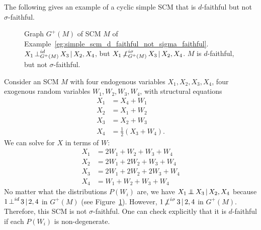 The following gives an example of a cyclic simple SCM that is $d$-faithful but not $\sigma$-faithful.
  \begin{Eg}\label{eg:simple_scm_d_faithful_not_sigma_faithful}
  \begin{figure}\centering
  \caption{Graph $G^+(M)$ of SCM $M$ of Example~\ref{eg:simple_scm_d_faithful_not_sigma_faithful}. 
  $X_1 \operatorname*{\perp}^{id}_{G^+(M)} X_3 \operatorname*{|} X_2, X_4$, but $X_1 \operatorname*{\not\perp}^{i\sigma}_{G^+(M)} X_3 \operatorname*{|} X_2, X_4$.
  $M$ is $d$-faithful, but not $\sigma$-faithful.\label{fig:simple_scm_d_faithful_not_sigma_faithful}}
  \end{figure}
Consider an SCM $M$ with four endogenous variables $X_1,X_2,X_3,X_4$, four exogenous random variables $W_1,W_2,W_3,W_4$, with structural equations
  \begin{align*}
    X_1&=X_4 + W_1 \\
    X_2&=X_1 + W_2 \\
    X_3&=X_2 + W_3 \\
    X_4&=\tfrac{1}{2} (X_3 + W_4).
  \end{align*}
We can solve for $X$ in terms of $W$:
  \begin{align*}
    X_1&=2 W_1 + W_2 + W_3 + W_4 \\
    X_2&=2 W_1 + 2 W_2 + W_3 + W_4 \\
    X_3&=2 W_1 + 2 W_2 + 2 W_3 + W_4 \\
    X_4&=W_1 + W_2 + W_3 + W_4
  \end{align*}
No matter what the distributions $P(W_i)$ are, we have $X_1 \operatorname*{\perp\mkern-11mu\perp} X_3 \operatorname*{|} X_2,X_4$ because $1 \operatorname*{\perp}^{id} 3 \operatorname*{|} 2,4$ in $G^+(M)$ (see Figure~\ref{fig:simple_scm_d_faithful_not_sigma_faithful}).
However, $1 \operatorname*{\not\perp}^{i\sigma} 3 \operatorname*{|} 2,4$ in $G^+(M)$.
Therefore, this SCM is not $\sigma$-faithful.
One can check explicitly that it is $d$-faithful if each $P(W_i)$ is non-degenerate.
\end{Eg}


